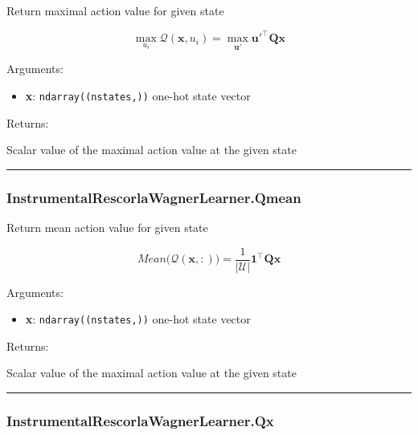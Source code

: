 Return maximal action value for given state

\[
\max_{u_i}\mathcal Q(\mathbf x, u_i) = \max_{\mathbf u'} \mathbf u'^\top \mathbf Q \mathbf x
\]

Arguments:

\begin{itemize}
\tightlist
\item
  \textbf{x}: \texttt{ndarray((nstates,))} one-hot state vector
\end{itemize}

Returns:

Scalar value of the maximal action value at the given state

\begin{center}\rule{0.5\linewidth}{\linethickness}\end{center}

\subsubsection{InstrumentalRescorlaWagnerLearner.Qmean}\label{instrumentalrescorlawagnerlearner.qmean}

\begin{Shaded}
\begin{Highlighting}[]
\end{Highlighting}
\end{Shaded}

Return mean action value for given state

\[
Mean \big(\mathcal Q(\mathbf x, :)\big) = \frac{1}{|\mathcal U|} \mathbf 1^\top \mathbf Q \mathbf x
\]

Arguments:

\begin{itemize}
\tightlist
\item
  \textbf{x}: \texttt{ndarray((nstates,))} one-hot state vector
\end{itemize}

Returns:

Scalar value of the maximal action value at the given state

\begin{center}\rule{0.5\linewidth}{\linethickness}\end{center}

\subsubsection{InstrumentalRescorlaWagnerLearner.Qx}\label{instrumentalrescorlawagnerlearner.qx}


